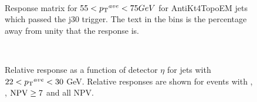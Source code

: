 \begin{figure}
\centering
\mbox{
}
\caption[]{
Response matrix for $55<\mbox{$\mbox{$p_{\rm T}$}{}^{ave}$}{}<75GeV$ for AntiKt4TopoEM jets which passed the j30 trigger. 
The text in the bins is the percentage away from unity that the response is.
\label{JetPerf:ResponseMatrix_55_75_j30}}
\end{figure}


\begin{figure}
\centering
\mbox{
}
\caption[]{
Relative response as a function of detector $\eta$ for jets with $22<\mbox{$\mbox{$p_{\rm T}$}{}^{ave}$}{}<30$ GeV.
Relative responses are shown for events with , , $\rm NPV\ge7$ and all NPV. 
\label{JetPerf:PtComp}}
\end{figure}


